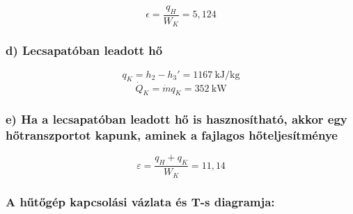 \begin{equation}
     \epsilon = \dfrac{q_H}{W_K} = 5,124
\end{equation}

\subsubsection* {d) Lecsapatóban leadott hő}

\begin{equation}
     q_K = h_2 - h_ 3' = \SI{1167}{\kilo\joule\per\kilogram}
\end{equation}
\begin{equation}
     \dot{Q}_K = \dot{m}  q_K =  \SI{352}{\kilo\watt } 
\end{equation}

\subsubsection*{e) Ha a lecsapatóban leadott hő is hasznosítható, akkor egy hőtranszportot kapunk, aminek a fajlagos hőteljesítménye}

\begin{equation}
    \varepsilon = \dfrac{q_H + q_K}{W_K} = 11,14
\end{equation}

\subsubsection* {A hűtőgép kapcsolási vázlata és T-s diagramja: }

